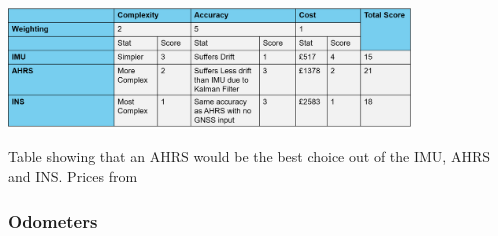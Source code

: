 \documentclass[11pt]{article}		%
\begin{document}
            \begin{table}[h]
					\centering
					\includegraphics[width=0.8\textwidth]{ahrs comparison in pounds.png}
					\caption{Table showing that an AHRS would be the best choice out of the IMU, AHRS and INS. Prices from \cite{Ellipse_Ahrs}}
					\label{AHRS_comparison}
				\end{table}
				
        \subsubsection{Odometers}
                
\end{document}
